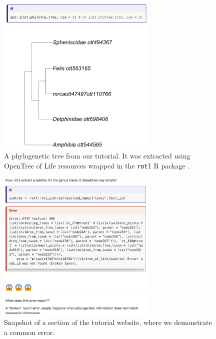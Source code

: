 \documentclass[12pt]{article}
\begin{document}
\begin{figure}
\begin{center}
\includegraphics[width=3in]{fig-tree.png}
\end{center}
\caption{A phylogenetic tree from our tutorial. It was extracted using OpenTree of Life resources \citep{opentreeoflife2019synth} wrapped in the \texttt{rotl} R package \citep{michonneau2016rotl}. \label{fig:tree}}
\end{figure}

\begin{figure}
\begin{center}
\includegraphics[width=3in]{fig-error.png}
\end{center}
\caption{Snapshot of a section of the tutorial website, where we demonstrate a common error. \label{fig:error}}
\end{figure}
\end{document}
